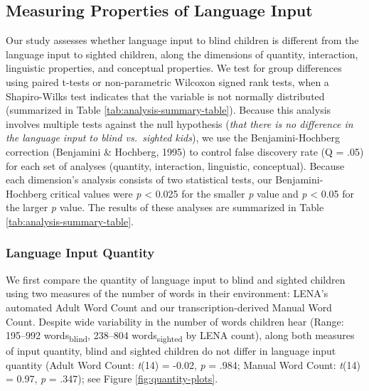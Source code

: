 \documentclass[
  man]{apa6}
\begin{document}
\hypertarget{measuring-properties-of-language-input}{%
\subsection{Measuring Properties of Language Input}\label{measuring-properties-of-language-input}}

Our study assesses whether language input to blind children is different from the language input to sighted children, along the dimensions of quantity, interaction, linguistic properties, and conceptual properties. We test for group differences using paired t-tests or non-parametric Wilcoxon signed rank tests, when a Shapiro-Wilks test indicates that the variable is not normally distributed (summarized in Table \ref{tab:analysis-summary-table}). Because this analysis involves multiple tests against the null hypothesis (\emph{that there is no difference in the language input to blind vs.~sighted kids}), we use the Benjamini-Hochberg correction (Benjamini \& Hochberg, 1995) to control false discovery rate (Q = .05) for each set of analyses (quantity, interaction, linguistic, conceptual). Because each dimension's analysis consists of two statistical tests, our Benjamini-Hochberg critical values were \emph{p} \textless{} 0.025 for the smaller \emph{p} value and \emph{p} \textless{} 0.05 for the larger \emph{p} value. The results of these analyses are summarized in Table \ref{tab:analysis-summary-table}.

\hypertarget{language-input-quantity}{%
\subsubsection{Language Input Quantity}\label{language-input-quantity}}

We first compare the quantity of language input to blind and sighted children using two measures of the number of words in their environment: LENA's automated Adult Word Count and our transcription-derived Manual Word Count. Despite wide variability in the number of words children hear (Range: 195--992 words\textsubscript{blind}, 238--804 words\textsubscript{sighted} by LENA count), along both measures of input quantity, blind and sighted children do not differ in language input quantity (Adult Word Count: \emph{t}(14) = -0.02, \emph{p} = .984; Manual Word Count: \emph{t}(14) = 0.97, \emph{p} = .347); see Figure \ref{fig:quantity-plots}.
\end{document}
